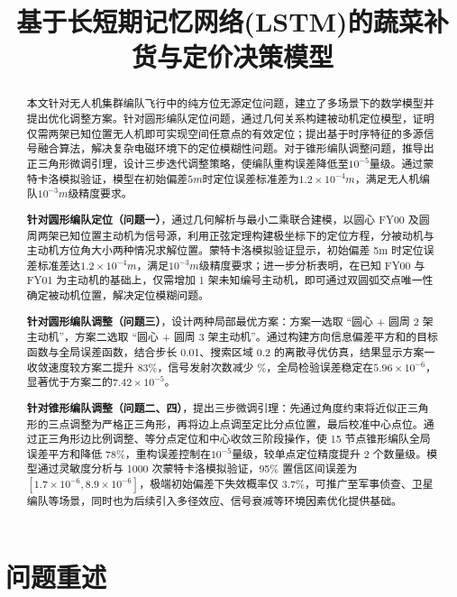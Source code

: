 \documentclass[withoutpreface,bwprint]{cumcmthesis} %
\title{基于长短期记忆网络(LSTM)的蔬菜补货与定价决策模型}
\begin{document}
\maketitle
\nocite{*}


\begin{abstract}
本文针对无人机集群编队飞行中的纯方位无源定位问题，建立了多场景下的数学模型并提出优化调整方案。针对圆形编队定位问题，通过几何关系构建被动机定位模型，证明仅需两架已知位置无人机即可实现空间任意点的有效定位；提出基于时序特征的多源信号融合算法，解决复杂电磁环境下的定位模糊性问题。对于锥形编队调整问题，推导出正三角形微调引理，设计三步迭代调整策略，使编队重构误差降低至$10^{−5}$量级。通过蒙特卡洛模拟验证，模型在初始偏差$5m$时定位误差标准差为$1.2×10^{−4}m$，满足无人机编队$10^{−3}m$级精度要求。

    \textbf{针对圆形编队定位（问题一）}，通过几何解析与最小二乘联合建模，以圆心 FY00 及圆周两架已知位置主动机为信号源，利用正弦定理构建极坐标下的定位方程，分被动机与主动机方位角大小两种情况求解位置。蒙特卡洛模拟验证显示，初始偏差 5m 时定位误差标准差达\(1.2×10^{−4}m\)，满足\(10^{−3}m\)级精度要求；进一步分析表明，在已知 FY00 与 FY01 为主动机的基础上，仅需增加 1 架未知编号主动机，即可通过双圆弧交点唯一性确定被动机位置，解决定位模糊问题。

    \textbf{针对圆形编队调整（问题三）}，设计两种局部最优方案：方案一选取 “圆心 + 圆周 2 架主动机”，方案二选取 “圆心 + 圆周 3 架主动机”。通过构建方向信息偏差平方和的目标函数与全局误差函数，结合步长 0.01、搜索区域 0.2 的离散寻优仿真，结果显示方案一收敛速度较方案二提升 83\%，信号发射次数减少 \%，全局检验误差稳定在\(5.96×10^{−6}\)，显著优于方案二的\(7.42×10^{−5}\)。

    \textbf{针对锥形编队调整（问题二、四）}，提出三步微调引理：先通过角度约束将近似正三角形的三点调整为严格正三角形，再将边上点调至定比分点位置，最后校准中心点位。通过正三角形边比例调整、等分点定位和中心收敛三阶段操作，使 15 节点锥形编队全局误差平方和降低 78\%，重构误差控制在\(10^{−5}\)量级，较单点定位精度提升 2 个数量级。模型通过灵敏度分析与 1000 次蒙特卡洛模拟验证，95\% 置信区间误差为\([1.7×10^{−6},8.9×10^{−6}]\)，极端初始偏差下失效概率仅 3.7\%，可推广至军事侦查、卫星编队等场景，同时也为后续引入多径效应、信号衰减等环境因素优化提供基础。
\end{abstract}

\section{问题重述}
\end{document}
